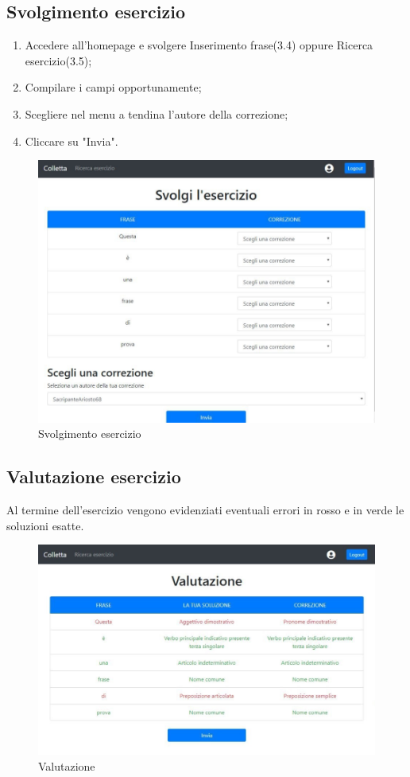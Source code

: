 \documentclass[11pt,a4paper]{article}
\begin{document}
{	\subsection{Svolgimento esercizio}
	\begin{enumerate}
		\item Accedere all'homepage e svolgere Inserimento frase(3.4) oppure Ricerca esercizio(3.5);
		\item Compilare i campi opportunamente;
		\item Scegliere nel menu a tendina l'autore della correzione;
		\item Cliccare su "Invia".
	\end{enumerate}
	\newpage

	\begin{figure}[h]
		\centering
		\includegraphics[scale=0.65]{images/svolgimento.jpg}
		\caption{Svolgimento esercizio}
	\end{figure}
	
	\subsection{Valutazione esercizio}
	Al termine dell'esercizio vengono evidenziati eventuali errori in rosso e in verde le soluzioni esatte.
	\newpage
		\begin{figure}[h!]
		\centering
		\includegraphics[scale=0.65]{images/valutazione.jpg}
		\caption{Valutazione}
	\end{figure}
	
}
\end{document}
